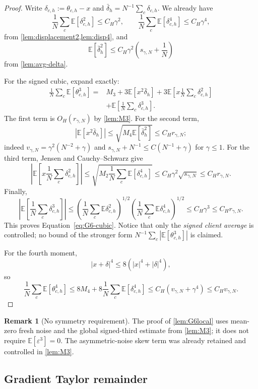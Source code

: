 \documentclass[11pt]{article}
\theoremstyle{definition}
\newtheorem{remark}[remark]{Remark}
\newcommand{\E}{\mathbb{E}}
\newcommand{\smallscale}{s_{\gamma,N}}
\newcommand{\remscale}{r_{\gamma,N}}
\newcommand{\fourthscale}{v_{\gamma,N}}
\newcommand{\eps}{\varepsilon}
\newcommand{\delt}{\delta}
\begin{document}
\begin{proof}
Write $\delt_{c,h}:=\theta_{c,h}-x$ and $\bar\delt_h=N^{-1}\sum_c\delt_{c,h}$. We already have
\[
  \frac1N\sum_c\E[\delt_{c,h}^2]\le C_H\gamma^2,
  \qquad
  \frac1N\sum_c\E[\delt_{c,h}^4]\le C_H\gamma^4,
\]
from \cref{lem:displacement2,lem:disp4}, and
\[
  \E[\bar\delt_h^2]\le C_H\gamma^2\left(\smallscale+\frac1N\right)
\]
from \cref{lem:avg-delta}.

For the signed cubic, expand exactly:
\begin{equation}
\label{eq:local-cubic-expand}
\begin{aligned}
  \frac1N\sum_c\E[\theta_{c,h}^3]
  ={}&M_3
  +3\E[x^2\bar\delt_h]
  +3\E\left[x\frac1N\sum_c\delt_{c,h}^2\right]\\
  &+\E\left[\frac1N\sum_c\delt_{c,h}^3\right].
\end{aligned}
\end{equation}
The first term is $O_H(\remscale)$ by \cref{lem:M3}. For the second term,
\[
  |\E[x^2\bar\delt_h]|
  \le \sqrt{M_4\E[\bar\delt_h^2]}
  \le C_H\remscale;
\]
indeed $\fourthscale=\gamma^2(N^{-2}+\gamma)$ and
$\smallscale+N^{-1}\le C(N^{-1}+\gamma)$ for $\gamma\le1$.
For the third term, Jensen and Cauchy--Schwarz give
\[
  \left|\E\left[x\frac1N\sum_c\delt_{c,h}^2\right]\right|
  \le \sqrt{M_2\frac1N\sum_c\E[\delt_{c,h}^4]}
  \le C_H\gamma^2\sqrt{\smallscale}
  \le C_H\remscale.
\]
Finally,
\[
  \left|\E\left[\frac1N\sum_c\delt_{c,h}^3\right]\right|
  \le \left(\frac1N\sum_c\E\delt_{c,h}^2\right)^{1/2}
       \left(\frac1N\sum_c\E\delt_{c,h}^4\right)^{1/2}
  \le C_H\gamma^3
  \le C_H\remscale.
\]
This proves Equation~\eqref{eq:G6-cubic}. Notice that only the \emph{signed client average} is controlled; no bound of the stronger form $N^{-1}\sum_c|\E[\theta_{c,h}^3]|$ is claimed.

For the fourth moment,
\[
  |x+\delt|^4\le 8(|x|^4+|\delt|^4),
\]
so
\[
  \frac1N\sum_c\E[\theta_{c,h}^4]
  \le 8M_4+8\frac1N\sum_c\E[\delt_{c,h}^4]
  \le C_H(\fourthscale+\gamma^4)
  \le C_H\fourthscale.
\]
\end{proof}

\begin{remark}[No symmetry requirement]
The proof of \cref{lem:G6local} uses mean-zero fresh noise and the global signed-third estimate from \cref{lem:M3}; it does not require $\E[\eps^3]=0$. The asymmetric-noise skew term was already retained and controlled in \cref{lem:M3}.
\end{remark}

\subsection{Gradient Taylor remainder}
\end{document}
